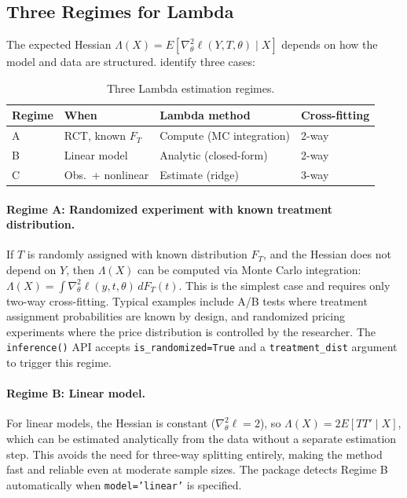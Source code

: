 \subsection{Three Regimes for Lambda}\label{sec:regimes}

The expected Hessian $\Lambda(X) = E[\nabla_\theta^2 \ell(Y, T, \theta) \mid X]$ depends on how the model and data are structured. \citet{farrell2025deep} identify three cases:

\begin{table}[ht]
\centering
\caption{Three Lambda estimation regimes.}\label{tab:regimes}
\begin{tabular}{llll}
\toprule
\textbf{Regime} & \textbf{When} & \textbf{Lambda method} & \textbf{Cross-fitting} \\
\midrule
A & RCT, known $F_T$ & Compute (MC integration) & 2-way \\
B & Linear model      & Analytic (closed-form)   & 2-way \\
C & Obs.\ + nonlinear & Estimate (ridge)         & 3-way \\
\bottomrule
\end{tabular}
\end{table}

\paragraph{Regime A: Randomized experiment with known treatment distribution.}
If $T$ is randomly assigned with known distribution $F_T$, and the Hessian does not depend on $Y$, then $\Lambda(X)$ can be computed via Monte Carlo integration:
$\Lambda(X) = \int \nabla_\theta^2 \ell(y, t, \theta) \, dF_T(t)$.
This is the simplest case and requires only two-way cross-fitting. Typical examples include A/B tests where treatment assignment probabilities are known by design, and randomized pricing experiments where the price distribution is controlled by the researcher. The \texttt{inference()} API accepts \texttt{is\_randomized=True} and a \texttt{treatment\_dist} argument to trigger this regime.

\paragraph{Regime B: Linear model.}
For linear models, the Hessian is constant ($\nabla_\theta^2 \ell = 2$), so $\Lambda(X) = 2E[T T' \mid X]$, which can be estimated analytically from the data without a separate estimation step. This avoids the need for three-way splitting entirely, making the method fast and reliable even at moderate sample sizes. The package detects Regime B automatically when \texttt{model='linear'} is specified.

